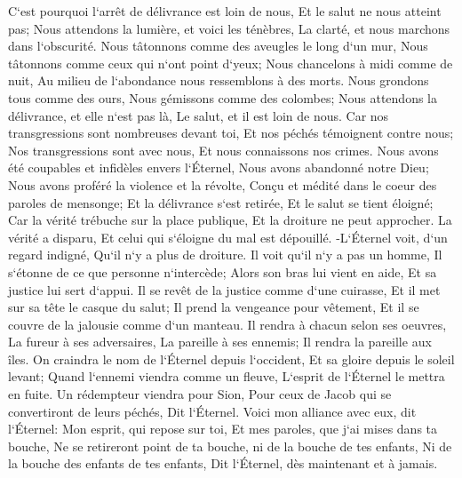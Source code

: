 \verse C`est pourquoi l`arrêt de délivrance est loin de nous, Et le salut ne nous atteint pas; Nous attendons la lumière, et voici les ténèbres, La clarté, et nous marchons dans l`obscurité. 
\verse Nous tâtonnons comme des aveugles le long d`un mur, Nous tâtonnons comme ceux qui n`ont point d`yeux; Nous chancelons à midi comme de nuit, Au milieu de l`abondance nous ressemblons à des morts. 
\verse Nous grondons tous comme des ours, Nous gémissons comme des colombes; Nous attendons la délivrance, et elle n`est pas là, Le salut, et il est loin de nous. 
\verse Car nos transgressions sont nombreuses devant toi, Et nos péchés témoignent contre nous; Nos transgressions sont avec nous, Et nous connaissons nos crimes. 
\verse Nous avons été coupables et infidèles envers l`Éternel, Nous avons abandonné notre Dieu; Nous avons proféré la violence et la révolte, Conçu et médité dans le coeur des paroles de mensonge; 
\verse Et la délivrance s`est retirée, Et le salut se tient éloigné; Car la vérité trébuche sur la place publique, Et la droiture ne peut approcher. 
\verse La vérité a disparu, Et celui qui s`éloigne du mal est dépouillé. -L`Éternel voit, d`un regard indigné, Qu`il n`y a plus de droiture. 
\verse Il voit qu`il n`y a pas un homme, Il s`étonne de ce que personne n`intercède; Alors son bras lui vient en aide, Et sa justice lui sert d`appui. 
\verse Il se revêt de la justice comme d`une cuirasse, Et il met sur sa tête le casque du salut; Il prend la vengeance pour vêtement, Et il se couvre de la jalousie comme d`un manteau. 
\verse Il rendra à chacun selon ses oeuvres, La fureur à ses adversaires, La pareille à ses ennemis; Il rendra la pareille aux îles. 
\verse On craindra le nom de l`Éternel depuis l`occident, Et sa gloire depuis le soleil levant; Quand l`ennemi viendra comme un fleuve, L`esprit de l`Éternel le mettra en fuite. 
\verse Un rédempteur viendra pour Sion, Pour ceux de Jacob qui se convertiront de leurs péchés, Dit l`Éternel. 
\verse Voici mon alliance avec eux, dit l`Éternel: Mon esprit, qui repose sur toi, Et mes paroles, que j`ai mises dans ta bouche, Ne se retireront point de ta bouche, ni de la bouche de tes enfants, Ni de la bouche des enfants de tes enfants, Dit l`Éternel, dès maintenant et à jamais. 

